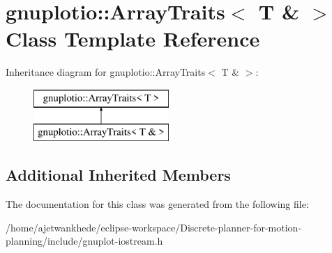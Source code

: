 \hypertarget{classgnuplotio_1_1ArrayTraits_3_01T_01_6_01_4}{}\section{gnuplotio\+:\+:Array\+Traits$<$ T \& $>$ Class Template Reference}
\label{classgnuplotio_1_1ArrayTraits_3_01T_01_6_01_4}
Inheritance diagram for gnuplotio\+:\+:Array\+Traits$<$ T \& $>$\+:\begin{figure}[H]
\begin{center}
\leavevmode
\includegraphics[height=2.000000cm]{classgnuplotio_1_1ArrayTraits_3_01T_01_6_01_4}
\end{center}
\end{figure}
\subsection*{Additional Inherited Members}


The documentation for this class was generated from the following file\+:\begin{DoxyCompactItemize}
\item 
/home/ajetwankhede/eclipse-\/workspace/\+Discrete-\/planner-\/for-\/motion-\/planning/include/gnuplot-\/iostream.\+h\end{DoxyCompactItemize}
